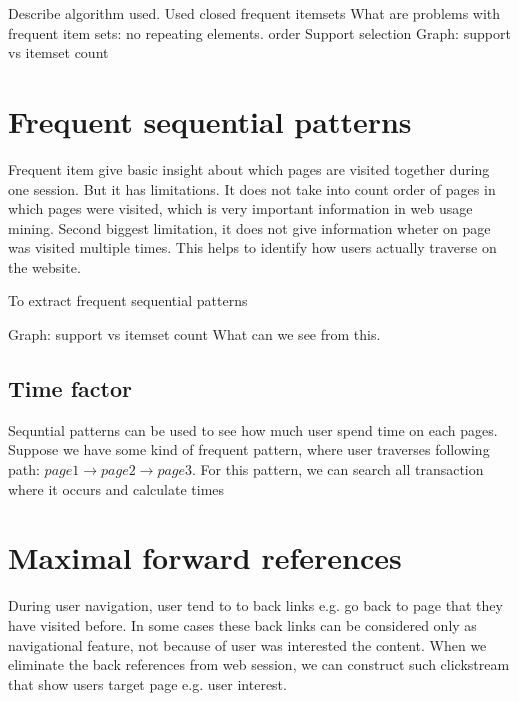 \documentclass[english,a4paper]{article}
\begin{document}
Describe algorithm used. Used closed frequent itemsets
What are problems with frequent item sets: no  repeating elements. order
Support selection
Graph: support vs itemset count





\section{Frequent sequential patterns}

Frequent item give basic insight about which pages are visited together during one session. But it has limitations. It does not take into count order of pages in which pages were visited, which is very important information in web usage mining. Second biggest limitation, it does not give information wheter on page was visited multiple times. This helps to identify how users actually traverse on the website.

To extract frequent sequential patterns

Graph: support vs itemset count
What can we see from this.





\subsection{Time factor}
Sequntial patterns can be used to see how much user spend time on each pages. Suppose we have some kind of frequent pattern, where user traverses following path: $page1 \rightarrow page2 \rightarrow page3$. For this pattern, we can search all transaction where it occurs and calculate times













\section{Maximal forward references}

During user navigation, user tend to to back links e.g. go back to page that they have visited before. In some cases these back links can be considered only as navigational feature, not because of user was interested the content.  When we eliminate the back references from web session, we can construct such clickstream that show users target page e.g. user interest.
\end{document}
